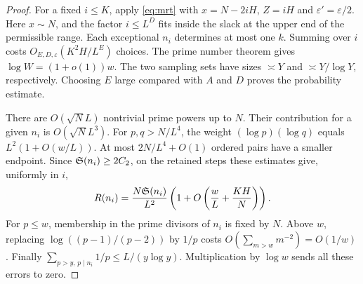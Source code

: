 \begin{proof}
For a fixed \(i\le K\), apply \eqref{eq:mrt} with
\(x=N-2iH\), \(Z=iH\) and \(\varepsilon'=\varepsilon/2\).
Here \(x\sim N\), and the factor \(i\le L^D\) fits inside the slack
at the upper end of the permissible range. Each exceptional \(n_i\)
determines at most one \(k\). Summing over \(i\) costs
\(O_{E,D,\varepsilon}(K^2H/L^E)\) choices. The prime number theorem
gives \(\log W=(1+o(1))w\). The two sampling sets have sizes
\(\asymp Y\) and \(\asymp Y/\log Y\), respectively. Choosing \(E\)
large compared with \(A\) and \(D\) proves the probability estimate.

There are \(O(\sqrt N L)\) nontrivial prime powers up to \(N\).
Their contribution for a given \(n_i\) is \(O(\sqrt N L^3)\).
For \(p,q>N/L^4\), the weight \((\log p)(\log q)\) equals
\(L^2(1+O(w/L))\). At most \(2N/L^4+O(1)\) ordered pairs have a smaller
endpoint. Since \(\mathfrak S(n_i)\ge2C_2\), on the retained steps these estimates
give, uniformly in \(i\),
\[
 R(n_i)=\frac{N\mathfrak S(n_i)}{L^2}
             \left(1+O\left(\frac{w}{L}+\frac{KH}{N}\right)\right).
\]
For \(p\le w\), membership in the prime divisors of \(n_i\) is fixed by
\(N\). Above \(w\), replacing
\(\log((p-1)/(p-2))\) by \(1/p\) costs \(O(\sum_{m>w}m^{-2})=O(1/w)\).
Finally \(\sum_{p>y,\,p\mid n_i}1/p\le L/(y\log y)\). Multiplication
by \(\log w\) sends all these errors to zero.
\end{proof}
